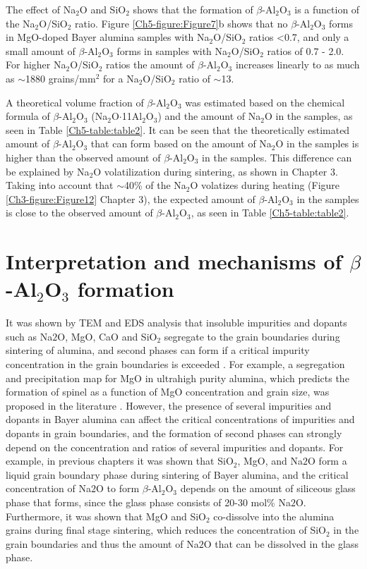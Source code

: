 The effect of Na$_{2}$O and SiO$_{2}$ shows that the formation of $\beta$-Al$_{2}$O$_{3}$ is a function of the Na$_{2}$O/SiO$_{2}$ ratio. Figure \ref{Ch5-figure:Figure7}b shows that no $\beta$-Al$_{2}$O$_{3}$ forms in MgO-doped Bayer alumina samples with Na$_{2}$O/SiO$_{2}$ ratios <0.7, and only a small amount of $\beta$-Al$_{2}$O$_{3}$ forms in samples with Na$_{2}$O/SiO$_{2}$ ratios of 0.7 - 2.0. For higher Na$_{2}$O/SiO$_{2}$ ratios the amount of $\beta$-Al$_{2}$O$_{3}$ increases linearly to as much as $\sim$1880 grains/mm$^{2}$ for a Na$_{2}$O/SiO$_{2}$ ratio of $\sim$13. 

A theoretical volume fraction of $\beta$-Al$_{2}$O$_{3}$ was estimated based on the chemical formula of $\beta$-Al$_{2}$O$_{3}$ (Na$_{2}$O$\cdot$11Al$_{2}$O$_{3}$) and the amount of Na$_{2}$O in the samples, as seen in Table \ref{Ch5-table:table2}. It can be seen that the theoretically estimated amount of $\beta$-Al$_{2}$O$_{3}$ that can form based on the amount of Na$_{2}$O in the samples is higher than the observed amount of $\beta$-Al$_{2}$O$_{3}$ in the samples. This difference can be explained by Na$_{2}$O volatilization during sintering, as shown in Chapter 3. Taking into account that $\sim$40\% of the Na$_{2}$O volatizes during heating (Figure \ref{Ch3-figure:Figure12} Chapter 3), the expected amount of $\beta$-Al$_{2}$O$_{3}$ in the samples is close to the observed amount of $\beta$-Al$_{2}$O$_{3}$, as seen in Table \ref{Ch5-table:table2}. 

\section{Interpretation and mechanisms of $\beta$-Al$_{2}$O$_{3}$ formation}
It was shown by TEM and EDS analysis that insoluble impurities and dopants such as Na${2}$O, MgO, CaO and SiO$_{2}$ segregate to the grain boundaries during sintering of alumina, and second phases can form if a critical impurity concentration in the grain boundaries is exceeded \cite{Zuo2013}. For example, a segregation and precipitation map for MgO in ultrahigh purity alumina, which predicts the formation of spinel as a function of MgO concentration and grain size, was proposed in the literature \cite{Zuo2013}. However, the presence of several impurities and dopants in Bayer alumina can affect the critical concentrations of impurities and dopants in grain boundaries, and the formation of second phases can strongly depend on the concentration and ratios of several impurities and dopants. For example, in previous chapters it was shown that SiO$_{2}$, MgO, and Na${2}$O form a liquid grain boundary phase during sintering of Bayer alumina, and the critical concentration of Na${2}$O to form $\beta$-Al$_{2}$O$_{3}$ depends on the amount of siliceous glass phase that forms, since the glass phase consists of 20-30 mol\% Na${2}$O. Furthermore, it was shown that MgO and SiO$_{2}$ co-dissolve into the alumina grains during final stage sintering, which reduces the concentration of SiO$_{2}$ in the grain boundaries and thus the amount of Na${2}$O that can be dissolved in the glass phase.

